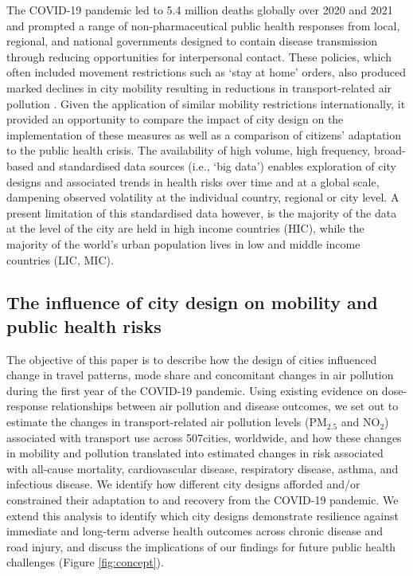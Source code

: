 \documentclass[preprint,10pt]{elsarticle} %
\begin{document}
The COVID-19 pandemic led to 5.4 million deaths globally over 2020 and 2021 \cite{Taylor2022} and prompted a range of non-pharmaceutical public health responses from local, regional, and national governments\cite{Hunter2023LPH} designed to contain disease transmission through reducing opportunities for interpersonal contact. These policies, which often included movement restrictions such as `stay at home' orders, also produced marked declines in city mobility resulting in reductions in transport-related air pollution \cite{Forster2020,He2020,LeQuere2020,Venter2020}. Given the application of similar mobility restrictions internationally, it provided an opportunity to compare the impact of city design on the implementation of these measures as well as a comparison of citizens' adaptation to the public health crisis. The availability of high volume, high frequency, broad-based and standardised data sources (i.e., `big data') enables exploration of city designs and associated trends in health risks over time and at a global scale, dampening observed volatility at the individual country, regional or city level. A present limitation of this standardised data however, is the majority of the data at the level of the city are held in high income countries (HIC), while the majority of the world's urban population lives in low and middle income countries (LIC, MIC)\cite{Smit2021}.

\subsection*{The influence of city design on mobility and public health risks}
The objective of this paper is to describe how the design of cities influenced change in travel patterns, mode share and concomitant changes in air pollution during the first year of the COVID-19 pandemic. Using existing evidence on dose-response relationships between air pollution and disease outcomes, we set out to estimate the changes in transport-related air pollution levels (PM$_{2.5}$ and NO$_{2}$) associated with transport use across 507cities, worldwide, and how these changes in mobility and pollution translated into estimated changes in risk associated with all-cause mortality, cardiovascular disease, respiratory disease, asthma, and infectious disease. We identify how different city designs afforded and/or constrained their adaptation to and recovery from the COVID-19 pandemic. We extend this analysis to identify which city designs demonstrate resilience against immediate and long-term adverse health outcomes across chronic disease and road injury, and discuss the implications of our findings for future public health challenges (Figure \ref{fig:concept}).
\end{document}
